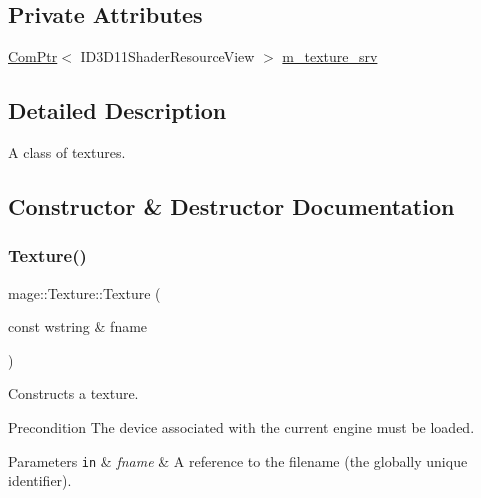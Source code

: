 \subsection*{Private Attributes}
\begin{DoxyCompactItemize}
\item 
\hyperlink{namespacemage_ae74f374780900893caa5555d1031fd79}{Com\+Ptr}$<$ I\+D3\+D11\+Shader\+Resource\+View $>$ \hyperlink{classmage_1_1_texture_a8666bb39618e89e782c7cfeabebcc2b0}{m\+\_\+texture\+\_\+srv}
\end{DoxyCompactItemize}


\subsection{Detailed Description}
A class of textures. 

\subsection{Constructor \& Destructor Documentation}
\hypertarget{classmage_1_1_texture_a80de233bcc89478bc1ad904430290ad3}{}\label{classmage_1_1_texture_a80de233bcc89478bc1ad904430290ad3} 
\subsubsection{\texorpdfstring{Texture()}{Texture()}\hspace{0.1cm}{\footnotesize\ttfamily [1/6]}}
{\footnotesize\ttfamily mage\+::\+Texture\+::\+Texture (\begin{DoxyParamCaption}\item[{const wstring \&}]{fname }\end{DoxyParamCaption})\hspace{0.3cm}{\ttfamily [explicit]}}

Constructs a texture.

\begin{DoxyPrecond}{Precondition}
The device associated with the current engine must be loaded. 
\end{DoxyPrecond}

\begin{DoxyParams}[1]{Parameters}
\mbox{\tt in}  & {\em fname} & A reference to the filename (the globally unique identifier). \\
\hline
\end{DoxyParams}

